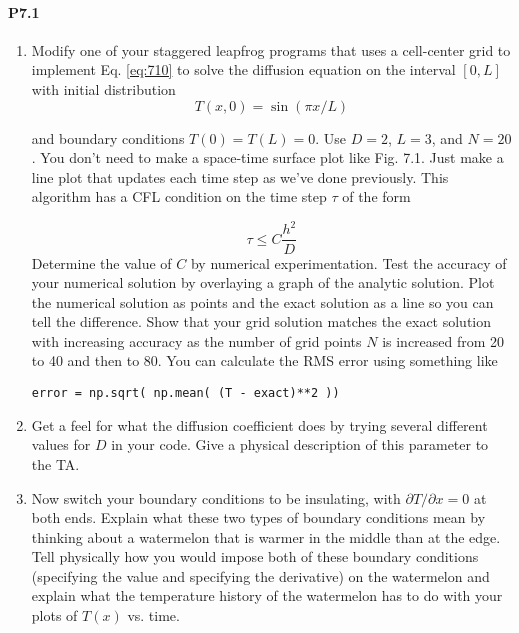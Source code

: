 \paragraph*{P7.1}
\begin{enumerate}[label=(\alph*)]
\item 
Modify one of your staggered leapfrog programs that uses a cell-center
grid to implement Eq. \eqref{eq:710} to solve the diffusion equation on the
interval $[0,L]$ with initial distribution
\begin{equation}\label{eq:711}
T(x, 0)=\sin (\pi x / L)
\end{equation}

and boundary conditions $ T(0) = T (L) = 0$. Use $D = 2$, $L = 3$, and $N =
20$. You don\rq t need to make a space-time surface plot like Fig. 7.1. Just
make a line plot that updates each time step as we\rq ve done previously.
This algorithm has a CFL condition on the time step $\tau$ of the form

\begin{equation}\label{eq:712}
\tau \leq C \frac{h^{2}}{D}
\end{equation}
Determine the value of $C$ by numerical experimentation.
Test the accuracy of your numerical solution by overlaying a graph of
the analytic solution. Plot the numerical solution as points and the
exact solution as a line so you can tell the difference. Show that your
grid solution matches the exact solution with increasing accuracy as
the number of grid points $N$ is increased from 20 to 40 and then to 80.
You can calculate the RMS error using something like
\begin{lstlisting}
error = np.sqrt( np.mean( (T - exact)**2 ))
\end{lstlisting}

\item Get a feel for what the diffusion coefficient does by trying several
different values for $D$ in your code. Give a physical description of this
parameter to the TA.
\item Now switch your boundary conditions to be insulating, with $\partial T / \partial x=
0$ at both ends. Explain what these two types of boundary conditions
mean by thinking about a watermelon that is warmer in the middle
than at the edge. Tell physically how you would impose both of these
boundary conditions (specifying the value and specifying the derivative) on the watermelon and explain what the temperature history of
the watermelon has to do with your plots of $T(x)$ vs. time.
\end{enumerate}
